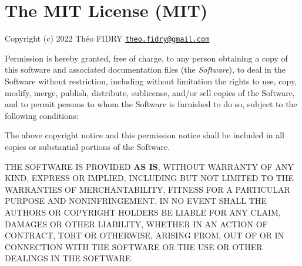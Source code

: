\chapter{The MIT License (MIT) }
\hypertarget{md__c_1_2xampp_2htdocs_2_g_pagos_ayuntamiento_2vendor_2fidry_2cpu-core-counter_2_l_i_c_e_n_s_e}{}\label{md__c_1_2xampp_2htdocs_2_g_pagos_ayuntamiento_2vendor_2fidry_2cpu-core-counter_2_l_i_c_e_n_s_e}
\label{md__c_1_2xampp_2htdocs_2_g_pagos_ayuntamiento_2vendor_2fidry_2cpu-core-counter_2_l_i_c_e_n_s_e_autotoc_md8972}%
%


Copyright (c) 2022 Théo FIDRY \href{mailto:theo.fidry@gmail.com}{\texttt{theo.\+fidry@gmail.\+com}}

Permission is hereby granted, free of charge, to any person obtaining a copy of this software and associated documentation files (the {\itshape Software}), to deal in the Software without restriction, including without limitation the rights to use, copy, modify, merge, publish, distribute, sublicense, and/or sell copies of the Software, and to permit persons to whom the Software is furnished to do so, subject to the following conditions\+:

The above copyright notice and this permission notice shall be included in all copies or substantial portions of the Software.

THE SOFTWARE IS PROVIDED {\bfseries{AS IS}}, WITHOUT WARRANTY OF ANY KIND, EXPRESS OR IMPLIED, INCLUDING BUT NOT LIMITED TO THE WARRANTIES OF MERCHANTABILITY, FITNESS FOR A PARTICULAR PURPOSE AND NONINFRINGEMENT. IN NO EVENT SHALL THE AUTHORS OR COPYRIGHT HOLDERS BE LIABLE FOR ANY CLAIM, DAMAGES OR OTHER LIABILITY, WHETHER IN AN ACTION OF CONTRACT, TORT OR OTHERWISE, ARISING FROM, OUT OF OR IN CONNECTION WITH THE SOFTWARE OR THE USE OR OTHER DEALINGS IN THE SOFTWARE. 